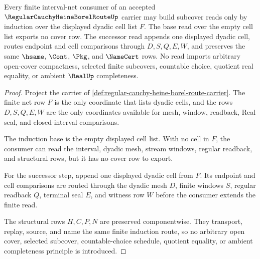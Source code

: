 \begin{theorem}
\label{thm:regular-cauchy-heine-borel-route-inductive-subcover}
Every finite interval-net consumer of an accepted $\RegularCauchyHeineBorelRouteUp$ carrier may build subcover reads only by induction over the displayed dyadic cell list $F$. The base read over the empty cell list exports no cover row. The successor read appends one displayed dyadic cell, routes endpoint and cell comparisons through $D,S,Q,E,W$, and preserves the same $\hsame$, $\Cont$, $\Pkg$, and $\NameCert$ rows. No read imports arbitrary open-cover compactness, selected finite subcovers, countable choice, quotient real equality, or ambient $\RealUp$ completeness.
\end{theorem}
\begin{proof}
Project the carrier of \autoref{def:regular-cauchy-heine-borel-route-carrier}. The finite net row $F$ is the only coordinate that lists dyadic cells, and the rows $D,S,Q,E,W$ are the only coordinates available for mesh, window, readback, Real seal, and closed-interval comparisons.

The induction base is the empty displayed cell list. With no cell in $F$, the consumer can read the interval, dyadic mesh, stream windows, regular readback, and structural rows, but it has no cover row to export.

For the successor step, append one displayed dyadic cell from $F$. Its endpoint and cell comparisons are routed through the dyadic mesh $D$, finite windows $S$, regular readback $Q$, terminal seal $E$, and witness row $W$ before the consumer extends the finite read.

The structural rows $H,C,P,N$ are preserved componentwise. They transport, replay, source, and name the same finite induction route, so no arbitrary open cover, selected subcover, countable-choice schedule, quotient equality, or ambient completeness principle is introduced.
\end{proof}

